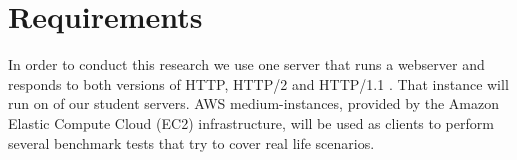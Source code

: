 \section{Requirements}
\label{req}
In order to conduct this research we use one server that runs a webserver and responds to both versions of HTTP, HTTP/2 and HTTP/1.1 \cite{http2-imp}. That instance will run on of our student servers. AWS medium-instances, provided by the Amazon Elastic Compute Cloud (EC2) \cite{amazon} infrastructure, will be used as clients to perform several benchmark tests that try to cover real life scenarios. 
